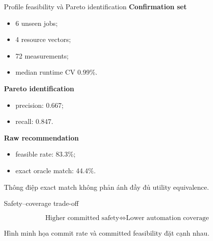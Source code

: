 \begin{frame}[t,shrink=20]{Profile feasibility và Pareto identification}
\scriptsize
\vspace{0.15em}
\textbf{Confirmation set}\par
\begin{itemize}
\item 6 unseen jobs;
\item 4 resource vectors;
\item 72 measurements;
\item median runtime CV 0.99\%.
\end{itemize}
\vspace{0.15em}
\textbf{Pareto identification}\par
\begin{itemize}
\item precision: 0.667;
\item recall: 0.847.
\end{itemize}
\vspace{0.15em}
\textbf{Raw recommendation}\par
\begin{itemize}
\item feasible rate: 83.3\%;
\item exact oracle match: 44.4\%.
\end{itemize}
\begin{alertblock}{Thông điệp}
exact match không phản ánh đầy đủ utility equivalence.
\end{alertblock}
\end{frame}

\begin{frame}[t,shrink=20]{Safety–coverage trade-off}
\scriptsize
\begin{center}
\scriptsize
\renewcommand{\arraystretch}{1.16}
\end{center}
\[
\text{Higher committed safety}
\Longleftrightarrow
\text{Lower automation coverage}
\]
\begin{exampleblock}{Hình minh họa}
commit rate và committed feasibility đặt cạnh nhau.
\end{exampleblock}
\end{frame}

